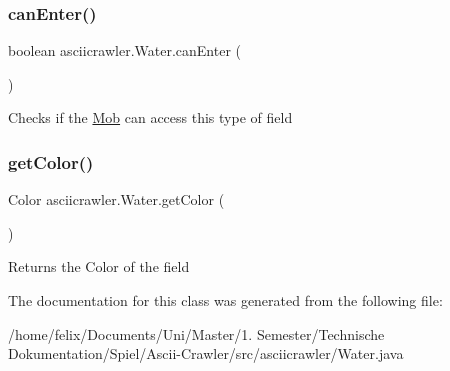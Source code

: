 \subsubsection{\texorpdfstring{can\+Enter()}{canEnter()}}
{\footnotesize\ttfamily boolean asciicrawler.\+Water.\+can\+Enter (\begin{DoxyParamCaption}{ }\end{DoxyParamCaption})\hspace{0.3cm}{\ttfamily [inline]}}

Checks if the \hyperlink{classasciicrawler_1_1Mob}{Mob} can access this type of field \mbox{\label{classasciicrawler_1_1Water_a43367f040a73539cdd92421cc351b4ca}} 
\subsubsection{\texorpdfstring{get\+Color()}{getColor()}}
{\footnotesize\ttfamily Color asciicrawler.\+Water.\+get\+Color (\begin{DoxyParamCaption}{ }\end{DoxyParamCaption})\hspace{0.3cm}{\ttfamily [inline]}}

Returns the Color of the field 

The documentation for this class was generated from the following file\+:\begin{DoxyCompactItemize}
\item 
/home/felix/\+Documents/\+Uni/\+Master/1. Semester/\+Technische Dokumentation/\+Spiel/\+Ascii-\/\+Crawler/src/asciicrawler/Water.\+java\end{DoxyCompactItemize}
